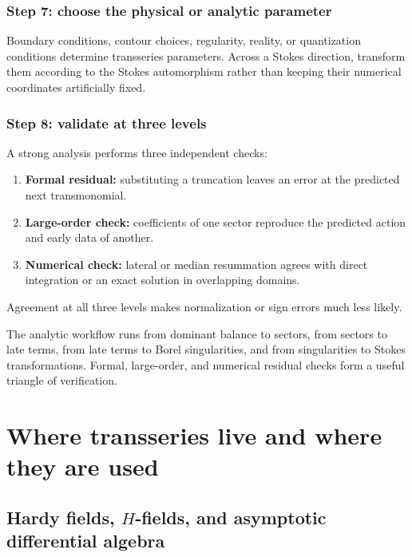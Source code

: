 \documentclass[11pt,oneside]{book}
\theoremstyle{definition}
\theoremstyle{remark}
\begin{document}
\section{Step 7: choose the physical or analytic parameter}

Boundary conditions, contour choices, regularity, reality, or quantization
conditions determine transseries parameters. Across a Stokes direction, transform
them according to the Stokes automorphism rather than keeping their numerical
coordinates artificially fixed.

\section{Step 8: validate at three levels}

A strong analysis performs three independent checks:
\begin{enumerate}
\item \textbf{Formal residual:} substituting a truncation leaves an error at the
predicted next transmonomial.
\item \textbf{Large-order check:} coefficients of one sector reproduce the
predicted action and early data of another.
\item \textbf{Numerical check:} lateral or median resummation agrees with direct
integration or an exact solution in overlapping domains.
\end{enumerate}
Agreement at all three levels makes normalization or sign errors much less
likely.

\begin{summarybox}
The analytic workflow runs from dominant balance to sectors, from sectors to
late terms, from late terms to Borel singularities, and from singularities to
Stokes transformations. Formal, large-order, and numerical residual checks form
a useful triangle of verification.
\end{summarybox}

\part{Where transseries live and where they are used}

\chapter{Hardy fields, \texorpdfstring{$H$}{H}-fields, and asymptotic differential algebra}
\label{ch:h-fields}
\end{document}
